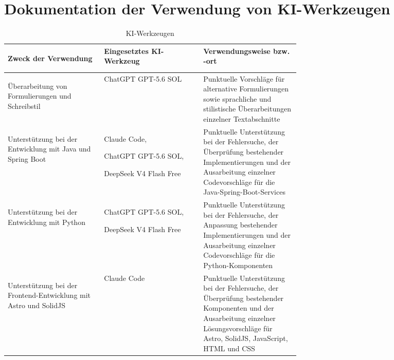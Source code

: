 \section{Dokumentation der Verwendung von KI-Werkzeugen}

\begin{table}[H]
    \centering
    {
        \renewcommand{\arraystretch}{1.5}
        \begin{tabularx}{\linewidth}{
                >{\bfseries\raggedright\arraybackslash}p{0.33\linewidth}
                >{\raggedright\arraybackslash}X
                >{\raggedright\arraybackslash}p{0.33\linewidth}
        }
        \toprule
        \rowcolor{tableHeaderColor}
        Zweck der Verwendung & Eingesetztes KI-Werkzeug & Verwendungsweise bzw. -ort \\
        \midrule

        Überarbeitung von Formulierungen und Schreibstil &
        ChatGPT GPT-5.6 SOL &
        Punktuelle Vorschläge für alternative Formulierungen sowie sprachliche und stilistische Überarbeitungen einzelner Textabschnitte \\

        Unterstützung bei der Entwicklung mit Java und Spring Boot &
        Claude Code,

        ChatGPT GPT-5.6 SOL,

        DeepSeek V4 Flash Free &
        Punktuelle Unterstützung bei der Fehlersuche, der Überprüfung bestehender Implementierungen und der Ausarbeitung einzelner Codevorschläge für die Java-Spring-Boot-Services \\

        Unterstützung bei der Entwicklung mit Python &
        ChatGPT GPT-5.6 SOL,

        DeepSeek V4 Flash Free &
        Punktuelle Unterstützung bei der Fehlersuche, der Anpassung bestehender Implementierungen und der Ausarbeitung einzelner Codevorschläge für die Python-Komponenten \\

        Unterstützung bei der Frontend-Entwicklung mit Astro und SolidJS &
        Claude Code &
        Punktuelle Unterstützung bei der Fehlersuche, der Überprüfung bestehender Komponenten und der Ausarbeitung einzelner Lösungsvorschläge für Astro, SolidJS, JavaScript, HTML und CSS \\

        \bottomrule
        \end{tabularx}}

    \caption{KI-Werkzeugen}
\end{table}


